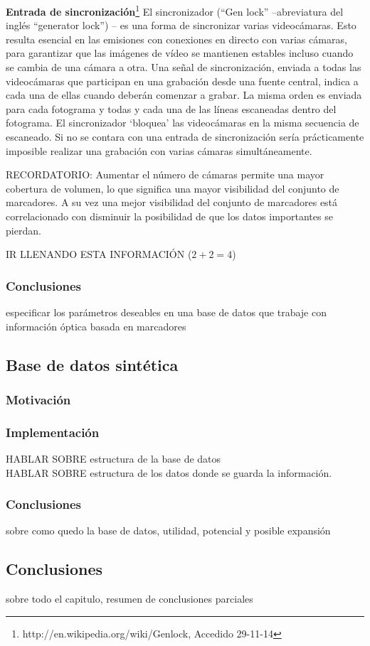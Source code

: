 \textbf{ Entrada de sincronización}\footnote{http://en.wikipedia.org/wiki/Genlock, Accedido 29-11-14}
El sincronizador (“Gen lock” –abreviatura del inglés “generator lock”) – es una forma de sincronizar varias videocámaras. Esto resulta esencial en las emisiones con conexiones en directo con varias cámaras, para garantizar que las imágenes de vídeo se mantienen estables incluso cuando se cambia de una cámara a otra.
Una señal de sincronización, enviada a todas las videocámaras que participan en una grabación desde una fuente central, indica a cada una de ellas cuando deberán comenzar a grabar. La misma orden es enviada para cada fotograma y todas y cada una de las líneas escaneadas dentro del fotograma. El sincronizador ‘bloquea’ las videocámaras en la misma secuencia de escaneado.
Si no se contara con una entrada de sincronización sería prácticamente imposible realizar una grabación con varias cámaras simultáneamente.


RECORDATORIO: Aumentar el número de cámaras permite una mayor cobertura de volumen, lo que significa una mayor visibilidad del conjunto de marcadores. A su vez una mejor visibilidad del conjunto de marcadores está correlacionado con disminuir la posibilidad de que los datos importantes se pierdan.




IR LLENANDO ESTA INFORMACIÓN ($2+2=4$)

\subsubsection{Conclusiones}
especificar los parámetros deseables en una base de datos que trabaje con información óptica basada en marcadores

\subsection{Base de datos sintética}
\subsubsection{Motivación}
\subsubsection{Implementación}
HABLAR SOBRE estructura de la base de datos\\
HABLAR SOBRE estructura de los datos donde se guarda la información.\\
\subsubsection{Conclusiones}
sobre como quedo la base de datos, utilidad, potencial y posible expansión

\subsection{Conclusiones}
sobre todo el capitulo, resumen de conclusiones parciales



